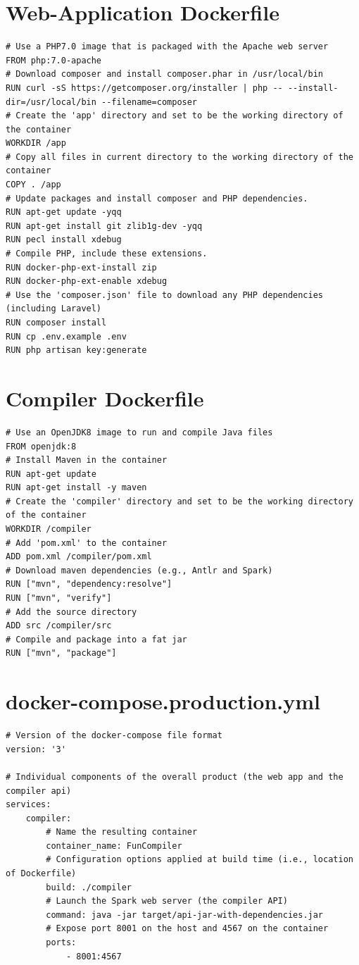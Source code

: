 \documentclass{l4proj}
\begin{document}
\begin{appendices}
\section{Web-Application Dockerfile}
\label{sec:web-dockerfile}
\begin{lstlisting}[language=config]
# Use a PHP7.0 image that is packaged with the Apache web server
FROM php:7.0-apache
# Download composer and install composer.phar in /usr/local/bin
RUN curl -sS https://getcomposer.org/installer | php -- --install-dir=/usr/local/bin --filename=composer
# Create the 'app' directory and set to be the working directory of the container
WORKDIR /app
# Copy all files in current directory to the working directory of the container
COPY . /app
# Update packages and install composer and PHP dependencies.
RUN apt-get update -yqq
RUN apt-get install git zlib1g-dev -yqq
RUN pecl install xdebug
# Compile PHP, include these extensions.
RUN docker-php-ext-install zip
RUN docker-php-ext-enable xdebug
# Use the 'composer.json' file to download any PHP dependencies (including Laravel)
RUN composer install
RUN cp .env.example .env
RUN php artisan key:generate
\end{lstlisting}

\section{Compiler Dockerfile}
\label{sec:compiler-dockerfile}
\begin{lstlisting}[language=config]
# Use an OpenJDK8 image to run and compile Java files
FROM openjdk:8
# Install Maven in the container
RUN apt-get update
RUN apt-get install -y maven
# Create the 'compiler' directory and set to be the working directory of the container
WORKDIR /compiler
# Add 'pom.xml' to the container
ADD pom.xml /compiler/pom.xml
# Download maven dependencies (e.g., Antlr and Spark)
RUN ["mvn", "dependency:resolve"]
RUN ["mvn", "verify"]
# Add the source directory
ADD src /compiler/src
# Compile and package into a fat jar
RUN ["mvn", "package"]
\end{lstlisting}

\section{docker-compose.production.yml}
\label{sec:docker-compose}
\begin{lstlisting}[language=config]
# Version of the docker-compose file format
version: '3'

# Individual components of the overall product (the web app and the compiler api)
services:
    compiler:
        # Name the resulting container
        container_name: FunCompiler
        # Configuration options applied at build time (i.e., location of Dockerfile)
        build: ./compiler
        # Launch the Spark web server (the compiler API)
        command: java -jar target/api-jar-with-dependencies.jar
        # Expose port 8001 on the host and 4567 on the container
        ports:
            - 8001:4567


\end{lstlisting}
\end{appendices}
\end{document}
